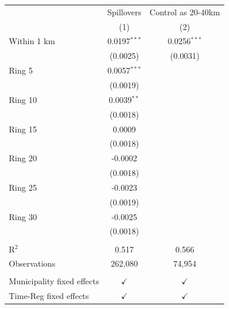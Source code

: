 \begingroup
\centering
\begin{tabular}{lcc}
   \toprule
                                 & Spillovers     & Control as 20-40km \\   
                                 & (1)            & (2)\\  
   \midrule 
   Within 1 km                   & 0.0197$^{***}$ & 0.0256$^{***}$\\   
                                 & (0.0025)       & (0.0031)\\   
   Ring 5                        & 0.0057$^{***}$ &   \\   
                                 & (0.0019)       &   \\   
   Ring 10                       & 0.0039$^{**}$  &   \\   
                                 & (0.0018)       &   \\   
   Ring 15                       & 0.0009         &   \\   
                                 & (0.0018)       &   \\   
   Ring 20                       & -0.0002        &   \\   
                                 & (0.0018)       &   \\   
   Ring 25                       & -0.0023        &   \\   
                                 & (0.0019)       &   \\   
   Ring 30                       & -0.0025        &   \\   
                                 & (0.0018)       &   \\   
    \\
   R$^2$                         & 0.517          & 0.566\\  
   Observations                  & 262,080        & 74,954\\  
    \\
   Municipality fixed effects & $\checkmark$   & $\checkmark$\\   
   Time-Reg fixed effects     & $\checkmark$   & $\checkmark$\\   
   \bottomrule
\end{tabular}
\par\endgroup
